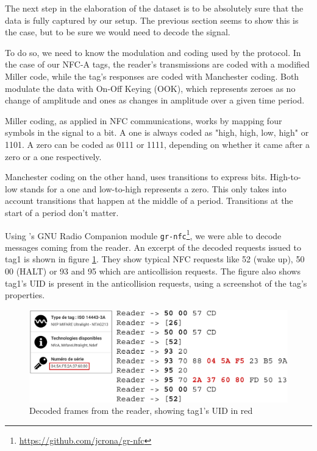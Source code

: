 The next step in the elaboration of the dataset is to be absolutely sure that the data is fully captured by our setup. The previous section seems to show this is the case, but to be sure we would need to decode the signal.

To do so, we need to know the modulation and coding used by the protocol. In the case of our NFC-A tags, the reader's transmissions are coded with a modified Miller code, while the tag's responses are coded with Manchester coding. Both modulate the data with On-Off Keying (OOK), which represents zeroes as no change of amplitude and ones as changes in amplitude over a given time period. \cite{wiki_off_2020}

Miller coding, as applied in NFC communications, works by mapping four symbols in the signal to a bit. A one is always coded as "high, high, low, high" or 1101. A zero can be coded as 0111 or 1111, depending on whether it came after a zero or a one respectively. \cite{phy_nfc_coding}

Manchester coding on the other hand, uses transitions to express bits. High-to-low stands for a one and low-to-high represents a zero. This only takes into account transitions that happen at the middle of a period. Transitions at the start of a period don't matter. \cite{phy_nfc_coding, wiki_manchester_2019}

Using \textcite{rona_sniffing_2017}'s GNU Radio Companion module \texttt{gr-nfc}\footnote{\url{https://github.com/jcrona/gr-nfc}}, we were able to decode messages coming from the reader. An excerpt of the decoded requests issued to tag1 is shown in figure \ref{fig:decoded}. They show typical NFC requests like 52 (wake up), 50 00 (HALT) or 93 and 95 which are anticollision requests. The figure also shows tag1's UID is present in the anticollision requests, using a screenshot of the tag's properties.

\begin{figure}[htbp!]
  \centering
  \includegraphics[scale=0.35]{figures/data_decoded-frames_app.png}
  \caption{Decoded frames from the reader, showing tag1's UID in red}
  \label{fig:decoded}
\end{figure}


